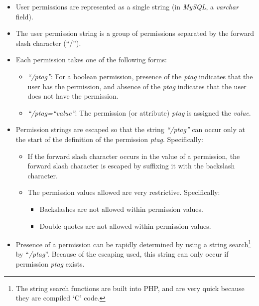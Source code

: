 \documentclass[letterpaper,10pt,titlepage]{article}
\begin{document}
\begin{itemize}
\item User permissions are represented as a single string (in \emph{MySQL}, a 
      \emph{varchar} field).
\item The user permission string is a group of permissions separated by
      the forward slash character (``/'').
\item Each permission takes one of the following forms:
      \begin{itemize}
      \item \emph{``/ptag''}: 
            For a boolean permission, presence of the
            \emph{ptag} indicates that the user has the permission, and absence
            of the \emph{ptag} indicates that the user does not have the permission.
      \item \emph{``/ptag=``value''}:
            The permission (or attribute) \emph{ptag} is assigned the
            \emph{value}.
      \end{itemize}
\item Permission strings are escaped so that the string \emph{``/ptag''}
      can occur only at the start of the definition of the permission
      \emph{ptag}.  Specifically:
      \begin{itemize}
      \item If the forward slash character occurs in the value of a
            permission, the forward slash character is escaped
            by suffixing it with the backslash character.
      \item The permission values allowed are very restrictive.  Specifically:
            \begin{itemize}
            \item Backslashes are not allowed within permission values.
            \item Double-quotes are not allowed within permission values.
            \end{itemize}
      \end{itemize}
\item Presence of a permission can be rapidly determined by using 
      a string search\footnote{The string search functions are built into PHP, and are
      very quick because they are compiled `C' code.}
      by ``\emph{/ptag}''.  Because of the escaping used,
      this string can only occur if permission \emph{ptag} exists.
\end{itemize}


\end{document}
